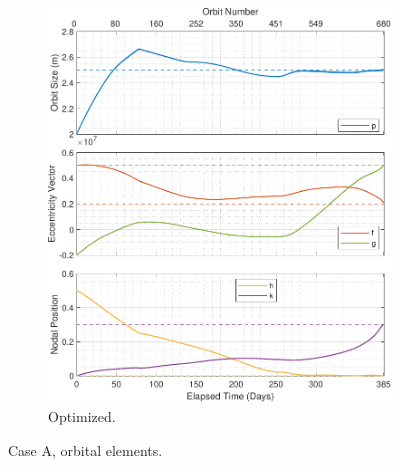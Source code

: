 \begin{figure}[H]
\begin{subfigure}[t]{0.49\textwidth}
        \includegraphics[width=\textwidth]{figures/benchmark_optim/orbital_elements.pdf}
        \caption{Optimized.}
        \label{fig:results_optim_a_2}
    \end{subfigure}
    \caption{Case A, orbital elements.}
    \label{fig:results_optim_a}
\end{figure}

